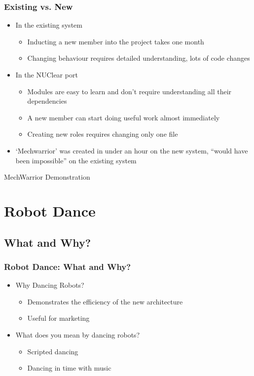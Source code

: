 \documentclass{beamer}
\begin{document}
\begin{frame}
	\frametitle{Existing vs. New}
	
	\begin{itemize}
		\item In the existing system
		\begin{itemize}
			\item Inducting a new member into the project takes one month
			\item Changing behaviour requires detailed understanding, lots of code changes
		\end{itemize}
		\item In the NUClear port
		\begin{itemize}
			\item Modules are easy to learn and don't require understanding all their dependencies
			\item A new member can start doing useful work almost immediately
			\item Creating new roles requires changing only one file
		\end{itemize}
		\item `Mechwarrior' was created in under an hour on the new system, ``would have been impossible'' on the existing system
	\end{itemize}
\end{frame}

\begin{frame}
	\huge MechWarrior Demonstration
\end{frame}

\section{Robot Dance}
	\begin{frame}
		\sectionpage %
	\end{frame}
	\subsection{What and Why?} %
	\begin{frame}
		\frametitle{Robot Dance: What and Why?}
		\begin{itemize}
			\item Why Dancing Robots?
			\begin{itemize}
				\item Demonstrates the efficiency of the new architecture
				\item Useful for marketing
			\end{itemize}
			\item What does you mean by dancing robots?
			\begin{itemize}
				\item Scripted dancing
				\item Dancing in time with music
			\end{itemize}
		\end{itemize}
	\end{frame}
\end{document}
